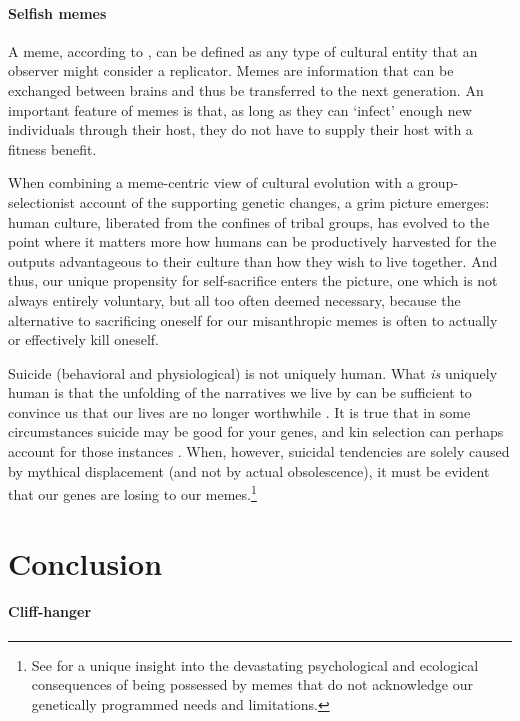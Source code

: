 \documentclass{article}
\begin{document}
\paragraph{Selfish memes}

A meme, according to \citet{dawkins1976}, can be defined as any type of
cultural entity that an observer might consider a replicator.  Memes are
information that can be exchanged between brains and thus be transferred to the
next generation. An important feature of memes is that, as long as they can
‘infect’ enough new individuals through their host, they do not have to supply
their host with a fitness benefit.

When combining a meme-centric view of cultural evolution with a
group-selectionist account of the supporting genetic changes, a grim picture
emerges: human culture, liberated from the confines of tribal groups, has
evolved to the point where it matters more how humans can be productively
harvested for the outputs advantageous to their culture than how they wish to
live together. And thus, our unique propensity for self-sacrifice enters the
picture, one which is not always entirely voluntary, but all too often deemed
necessary, because the alternative to sacrificing oneself for our misanthropic
memes is often to actually or effectively kill oneself.

Suicide (behavioral and physiological) is not uniquely human. What \emph{is}
uniquely human is that the unfolding of the narratives we live by can be
sufficient to convince us that our lives are no longer worthwhile
\citep{baumeister1990}. It is true that in some circumstances suicide may be
good for your genes, and kin selection can perhaps account for those instances
\citep{bering2010}. When, however, suicidal tendencies are solely caused by
mythical displacement (and not by actual obsolescence), it must be evident that
our genes are losing to our memes.\footnote{See \citet{quinn1992} for a unique
insight into the devastating psychological and ecological consequences of being
possessed by memes that do not acknowledge our genetically programmed needs and
limitations.}

\section{Conclusion}

\paragraph{Cliff-hanger}
\end{document}
